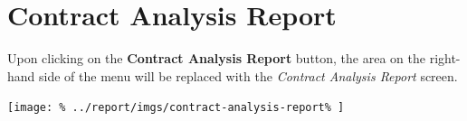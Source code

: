 \documentclass[../main/main]{subfiles}
\begin{document}
\newpage
\section{Contract Analysis Report}
\label{sec:contract-analysis-report}

Upon clicking on the \textbf{Contract Analysis Report} button,
the area on the right-hand side of the menu will be replaced with the
\emph{Contract Analysis Report} screen.

\texttt{[image: \%
  ../report/imgs/contract-analysis-report\%
]}
\end{document}
